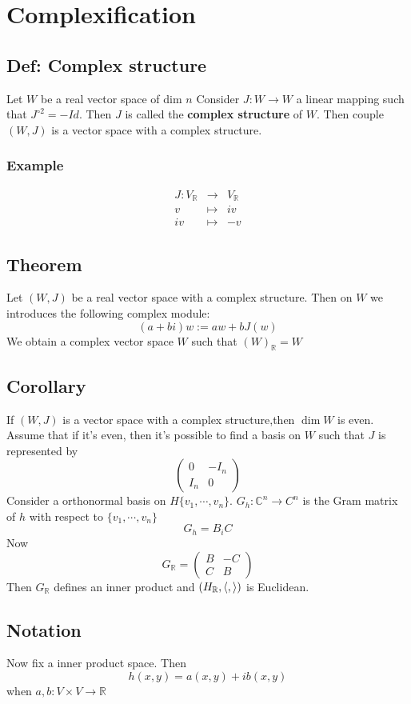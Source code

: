 \documentclass{book}
\begin{document}
\chapter{Complexification}
\section{Def: Complex structure}
Let $W$ be a real vector space of dim $n$ Consider $J:W\rightarrow W$ a linear mapping such that $J^{\circ 2}=-Id$. Then $J$ is called the \textbf{complex structure} of $W$. Then couple $(W,J)$ is a vector space with a complex structure.
\subsection*{Example}$$\begin{aligned}
    J:V_\mathbb{R}&\rightarrow & V_\mathbb{R}\\
    v&\mapsto&iv\\
    iv&\mapsto&-v
\end{aligned}$$
\section{Theorem}
Let $(W,J)$ be a real vector space with a complex structure. Then on $W$ we introduces the following complex module:
$$(a+bi)w:=aw+bJ(w)$$
We obtain a complex vector space $W$ such that $(W)_\mathbb{R}=W$
\section{Corollary}
If $(W,J)$ is a vector space with a complex structure,then $\dim W$ is even. Assume that if it's even, then it's possible to find a basis on $W$ such that $J$ is represented by$$\begin{pmatrix}
    0&-I_n\\I_n&0
\end{pmatrix}$$
Consider a orthonormal basis on $H\{v_1,\cdots, v_n\}$. $G_h:\mathbb{C}^n\rightarrow C^n$ is the Gram matrix of $h$ with respect to $\{v_1,\cdots,v_n\}$ $$G_h=B_iC$$ Now$$G_\mathbb{R}=\begin{pmatrix}
    B&-C\\C&B
\end{pmatrix}$$
Then $G_\mathbb{R}$ defines an inner product and $(H_\mathbb{R},\left<,\right>)$ is Euclidean.
\section{Notation}
Now fix a inner product space. Then $$h(x,y)=a(x,y)+ib(x,y)$$when $a,b: V\times V\rightarrow \mathbb{R}$
\end{document}
